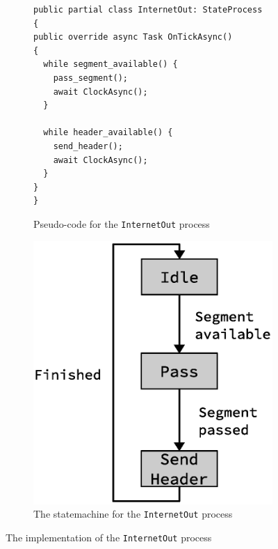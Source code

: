 \begin{figure}[htpb]
    \centering
    \begin{subfigure}[b]{0.5\textwidth}
        \centering
\begin{lstlisting}[language={[Sharp]C}]
public partial class InternetOut: StateProcess
{
public override async Task OnTickAsync()
{
  while segment_available() {
    pass_segment();
    await ClockAsync();
  }

  while header_available() {
    send_header();
    await ClockAsync();
  }
}
}
\end{lstlisting}
        \caption{Pseudo-code for the \texttt{InternetOut} process}
	\label{fig:internet_out_pseudocode}
    \end{subfigure}%
    \begin{subfigure}[b]{0.50\textwidth}
        \centering
        \includegraphics[scale=0.45]{implementation/internet_out_fsm.eps}
        \caption{The statemachine for the \texttt{InternetOut} process}
 	\label{fig:internet_out_fsm}
    \end{subfigure}%
    \caption{The implementation of the \texttt{InternetOut} process}
    \label{fig:internet_out_implementation}
\end{figure}


